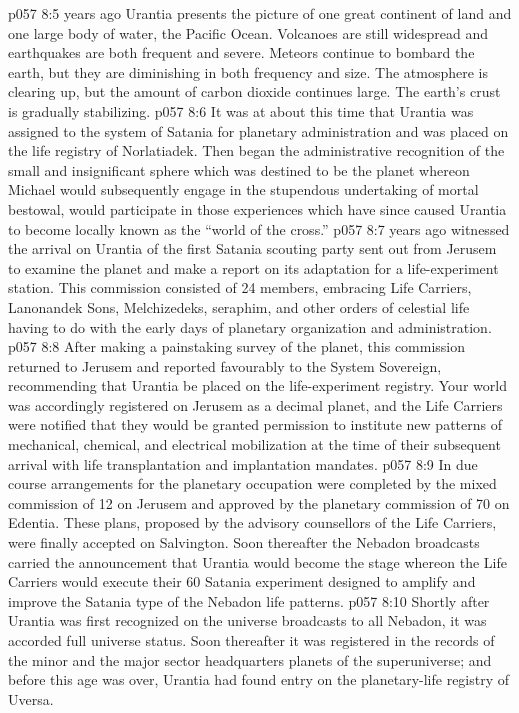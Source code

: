 \vs p057 8:5 \pc {} years ago Urantia presents the picture of one great continent of land and one large body of water, the Pacific Ocean. Volcanoes are still widespread and earthquakes are both frequent and severe. Meteors continue to bombard the earth, but they are diminishing in both frequency and size. The atmosphere is clearing up, but the amount of carbon dioxide continues large. The earth’s crust is gradually stabilizing.
\vs p057 8:6 It was at about this time that Urantia was assigned to the system of Satania for planetary administration and was placed on the life registry of Norlatiadek. Then began the administrative recognition of the small and insignificant sphere which was destined to be the planet whereon Michael would subsequently engage in the stupendous undertaking of mortal bestowal, would participate in those experiences which have since caused Urantia to become locally known as the “world of the cross.”
\vs p057 8:7 \pc {} years ago witnessed the arrival on Urantia of the first Satania scouting party sent out from Jerusem to examine the planet and make a report on its adaptation for a life\hyp{}experiment station. This commission consisted of 24 members, embracing Life Carriers, Lanonandek Sons, Melchizedeks, seraphim, and other orders of celestial life having to do with the early days of planetary organization and administration.
\vs p057 8:8 After making a painstaking survey of the planet, this commission returned to Jerusem and reported favourably to the System Sovereign, recommending that Urantia be placed on the life\hyp{}experiment registry. Your world was accordingly registered on Jerusem as a decimal planet, and the Life Carriers were notified that they would be granted permission to institute new patterns of mechanical, chemical, and electrical mobilization at the time of their subsequent arrival with life transplantation and implantation mandates.
\vs p057 8:9 In due course arrangements for the planetary occupation were completed by the mixed commission of 12 on Jerusem and approved by the planetary commission of 70 on Edentia. These plans, proposed by the advisory counsellors of the Life Carriers, were finally accepted on Salvington. Soon thereafter the Nebadon broadcasts carried the announcement that Urantia would become the stage whereon the Life Carriers would execute their 60 Satania experiment designed to amplify and improve the Satania type of the Nebadon life patterns.
\vs p057 8:10 Shortly after Urantia was first recognized on the universe broadcasts to all Nebadon, it was accorded full universe status. Soon thereafter it was registered in the records of the minor and the major sector headquarters planets of the superuniverse; and before this age was over, Urantia had found entry on the planetary\hyp{}life registry of Uversa.
